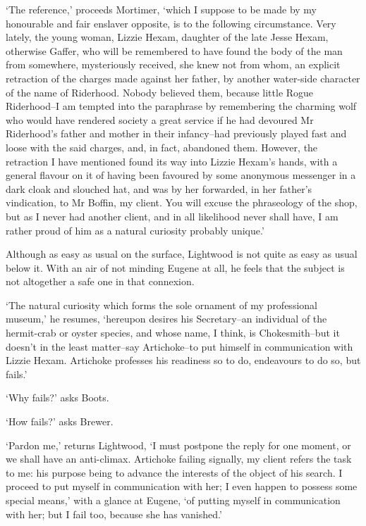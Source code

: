 ‘The reference,’ proceeds Mortimer, ‘which I suppose to be made by my
honourable and fair enslaver opposite, is to the following circumstance.
Very lately, the young woman, Lizzie Hexam, daughter of the late Jesse
Hexam, otherwise Gaffer, who will be remembered to have found the body
of the man from somewhere, mysteriously received, she knew not from
whom, an explicit retraction of the charges made against her father, by
another water-side character of the name of Riderhood. Nobody believed
them, because little Rogue Riderhood--I am tempted into the paraphrase
by remembering the charming wolf who would have rendered society a great
service if he had devoured Mr Riderhood’s father and mother in their
infancy--had previously played fast and loose with the said charges,
and, in fact, abandoned them. However, the retraction I have mentioned
found its way into Lizzie Hexam’s hands, with a general flavour on it
of having been favoured by some anonymous messenger in a dark cloak and
slouched hat, and was by her forwarded, in her father’s vindication, to
Mr Boffin, my client. You will excuse the phraseology of the shop, but
as I never had another client, and in all likelihood never shall have, I
am rather proud of him as a natural curiosity probably unique.’

Although as easy as usual on the surface, Lightwood is not quite as easy
as usual below it. With an air of not minding Eugene at all, he feels
that the subject is not altogether a safe one in that connexion.

‘The natural curiosity which forms the sole ornament of my professional
museum,’ he resumes, ‘hereupon desires his Secretary--an individual
of the hermit-crab or oyster species, and whose name, I think, is
Chokesmith--but it doesn’t in the least matter--say Artichoke--to put
himself in communication with Lizzie Hexam. Artichoke professes his
readiness so to do, endeavours to do so, but fails.’

‘Why fails?’ asks Boots.

‘How fails?’ asks Brewer.

‘Pardon me,’ returns Lightwood, ‘I must postpone the reply for one
moment, or we shall have an anti-climax. Artichoke failing signally, my
client refers the task to me: his purpose being to advance the interests
of the object of his search. I proceed to put myself in communication
with her; I even happen to possess some special means,’ with a glance
at Eugene, ‘of putting myself in communication with her; but I fail too,
because she has vanished.’

